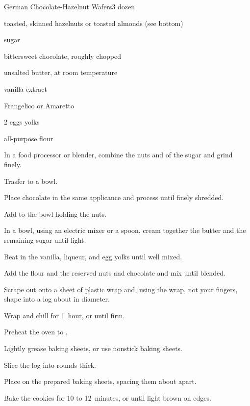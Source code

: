 \begin{recipe}{German Chocolate-Hazelnut Wafers}{}{3 dozen}

\begin{ingredients}
\item {} toasted, skinned hazelnuts or toasted almonds (see bottom)
\item \C{\third} sugar
\item {} bittersweet chocolate, roughly chopped
\item \C{\half} unsalted butter, at room temperature
\item {} vanilla extract
\item {} Frangelico or Amaretto
\item 2 eggs yolks
\item {} all-purpose flour
\end{ingredients}

\begin{directions}
\item In a food processor or blender, combine the nuts and  of the sugar and grind finely.
\item Trasfer to a bowl.
\item Place chocolate in the same applicance and process until finely shredded.
\item Add to the bowl holding the nuts.
\item In a bowl, using an electric mixer or a spoon, cream together the butter and the remaining sugar until light.
\item Beat in the vanilla, liqueur, and egg yolks until well mixed.
\item Add the flour and the reserved nuts and chocolate and mix until blended.
\item Scrape out onto a sheet of plastic wrap and, using the wrap, not your fingers, shape into a log about \inch{2\quarter} in diameter.
\item Wrap and chill for 1~hour, or until firm.
\item Preheat the oven to .
\item Lightly grease baking sheets, or use nonstick baking sheets.
\item Slice the log into rounds \cm{\half} thick.
\item Place on the prepared baking sheets, spacing them about \cm{1\half} apart.
\item Bake the cookies for 10 to 12~minutes, or until light brown on edges.
\end{directions}

\end{recipe}
